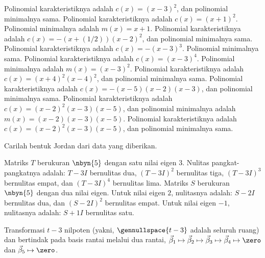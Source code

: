 \begin{exercises}
    \begin{answer}
      \begin{exparts}
        \partsitem Polinomial karakteristiknya adalah $c(x)=(x-3)^2$, dan
          polinomial minimalnya sama.
        \partsitem Polinomial karakteristiknya adalah $c(x)=(x+1)^2$.
          Polinomial minimalnya adalah $m(x)=x+1$.
        \partsitem Polinomial karakteristiknya adalah
          $c(x)=-(x+(1/2))(x-2)^2$, dan
          polinomial minimalnya sama.
        \partsitem Polinomial karakteristiknya adalah $c(x)=-(x-3)^3$.
          Polinomial minimalnya sama.
        \partsitem Polinomial karakteristiknya adalah $c(x)=(x-3)^4$.
          Polinomial minimalnya adalah $m(x)=(x-3)^2$.
        \partsitem Polinomial karakteristiknya adalah $c(x)=(x+4)^2(x-4)^2$, dan
          polinomial minimalnya sama.
        \partsitem Polinomial karakteristiknya adalah
          $c(x)=-(x-5)(x-2)(x-3)$, dan polinomial minimalnya sama.
        \partsitem Polinomial karakteristiknya adalah
          $c(x)=(x-2)^2(x-3)(x-5)$, dan
          polinomial minimalnya adalah $m(x)=(x-2)(x-3)(x-5)$.
        \partsitem Polinomial karakteristiknya adalah
          $c(x)=(x-2)^2(x-3)(x-5)$, dan
          polinomial minimalnya sama.
      \end{exparts}
    \end{answer}
  \recommended \item
    Carilah bentuk Jordan dari data yang diberikan.
    \begin{exparts}
       \partsitem Matriks
         \( T \) berukuran \( \nbyn{5} \) dengan satu nilai eigen $3$.
         Nulitas pangkat-pangkatnya adalah:
         \( T-3I \) bernulitas dua, \( (T-3I)^2 \) bernulitas tiga,
         \( (T-3I)^3 \) bernulitas empat, dan \( (T-3I)^4 \) bernulitas
         lima.
       \partsitem Matriks \( S \) berukuran \( \nbyn{5} \) dengan dua nilai eigen.
         Untuk nilai eigen $2$, nulitasnya adalah:
         \( S-2I \) bernulitas dua, dan \( (S-2I)^2 \) bernulitas empat.
         Untuk nilai eigen $-1$, nulitasnya adalah:
         \( S+1I \) bernulitas satu.
    \end{exparts}
    \begin{answer}
      \begin{exparts}
         \partsitem Transformasi $t-3$ nilpoten
          (yakni, $\gennullspace{t-3}$ adalah seluruh ruang)
          dan bertindak pada basis rantai melalui dua rantai,
          $\vec{\beta}_1\mapsto\vec{\beta}_2\mapsto\vec{\beta}_3
            \mapsto\vec{\beta}_4\mapsto\zero$
          dan $\vec{\beta}_5\mapsto\zero$.

\end{exparts}
\end{answer}
\end{exercises}
